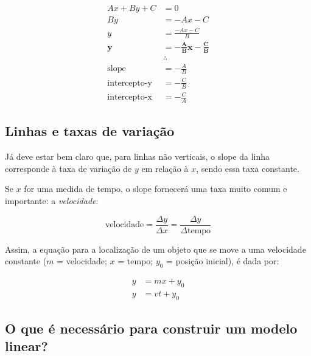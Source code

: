 \documentclass[pdftex, brazil, 12pt, twoside]{article}
\begin{document}
\begin{equation}
  \begin{split}
    Ax + By + C & = 0\\
    By & = -Ax -C\\
    y & = \frac{-Ax -C}{B}\\
    \bm{y} & \bm{= -\frac{A}{B}x -\frac{C}{B}}\\
    & \therefore\\
    \text{slope} & = -\frac{A}{B}\\
    \text{intercepto-y} & = -\frac{C}{B}\\
    \text{intercepto-x} & = -\frac{C}{A}
  \end{split}
\end{equation}


\subsection{Linhas e taxas de variação}
\label{modelagem-linear-linhas-taxa-variacao}

Já deve estar bem claro que, para linhas não verticais, o slope da linha corresponde
à taxa de variação de $y$ em relação à $x$, sendo essa taxa constante.

Se $x$ for
uma medida de tempo, o slope fornecerá uma taxa muito comum e importante: a \emph{velocidade}:

\begin{equation}
  \text{velocidade} = \frac{\Delta y}{\Delta x} = \frac{\Delta y}{\Delta \text{tempo}}
\end{equation}

Assim, a equação para a localização de um objeto que se move a uma velocidade constante
($m$ = velocidade; $x$ = tempo; $y_0$ = posição inicial), é dada por:

\begin{equation}
  \begin{split}
    y & = mx + y_0\\
    y & = vt + y_0
  \end{split}
\end{equation}


\subsection{O que é necessário para construir um modelo linear?}
\label{modelagem-linear-necessario-para-modelo}
\end{document}
